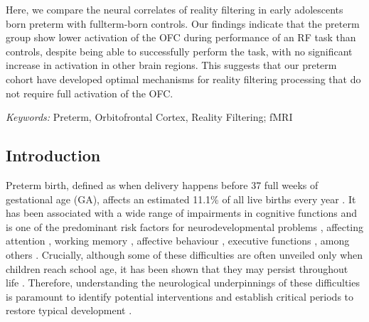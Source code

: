 Here, we compare the neural correlates of reality filtering in early adolescents born preterm with fullterm-born controls. Our findings indicate that the preterm group show lower activation of the OFC during performance of an RF task than controls, despite being able to successfully perform the task, with no significant increase in activation in other brain regions. This suggests that our preterm cohort have developed optimal mechanisms for reality filtering processing that do not require full activation of the OFC.

\textit{Keywords:} Preterm, Orbitofrontal Cortex, Reality Filtering; fMRI

\subsection{Introduction}



Preterm birth, defined as when delivery happens before 37 full weeks of gestational age (GA), affects an estimated 11.1\% of all live births every year \citep{Blencowe2013}.  
It has been associated with a wide range of impairments in cognitive functions and is one of the predominant risk factors for neurodevelopmental problems \citep{Twilhaar2018}, affecting attention \citep{Rommel2017}, working memory \citep{Allotey2018}, affective behaviour \citep{Hornman2016}, executive functions \citep{Costa2017, Burnett2018}, among others \citep{Moreira2014, Allotey2018}. Crucially, although some of these difficulties are often unveiled only when children reach school age, it has been shown that they may persist throughout life \citep{Anderson2014, Kajantie2019}. Therefore, understanding the neurological underpinnings of these difficulties is paramount to identify potential interventions and establish critical periods to restore typical development \citep{Wolke2019}.
    
